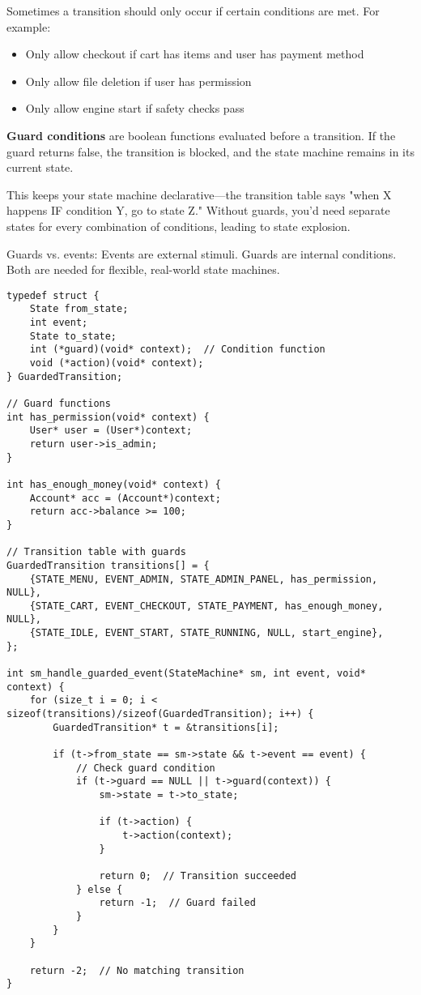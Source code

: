 Sometimes a transition should only occur if certain conditions are met. For example:
\begin{itemize}
    \item Only allow checkout if cart has items and user has payment method
    \item Only allow file deletion if user has permission
    \item Only allow engine start if safety checks pass
\end{itemize}

\textbf{Guard conditions} are boolean functions evaluated before a transition. If the guard returns false, the transition is blocked, and the state machine remains in its current state.

This keeps your state machine declarative---the transition table says "when X happens IF condition Y, go to state Z." Without guards, you'd need separate states for every combination of conditions, leading to state explosion.

Guards vs. events: Events are external stimuli. Guards are internal conditions. Both are needed for flexible, real-world state machines.

\begin{lstlisting}
typedef struct {
    State from_state;
    int event;
    State to_state;
    int (*guard)(void* context);  // Condition function
    void (*action)(void* context);
} GuardedTransition;

// Guard functions
int has_permission(void* context) {
    User* user = (User*)context;
    return user->is_admin;
}

int has_enough_money(void* context) {
    Account* acc = (Account*)context;
    return acc->balance >= 100;
}

// Transition table with guards
GuardedTransition transitions[] = {
    {STATE_MENU, EVENT_ADMIN, STATE_ADMIN_PANEL, has_permission, NULL},
    {STATE_CART, EVENT_CHECKOUT, STATE_PAYMENT, has_enough_money, NULL},
    {STATE_IDLE, EVENT_START, STATE_RUNNING, NULL, start_engine},
};

int sm_handle_guarded_event(StateMachine* sm, int event, void* context) {
    for (size_t i = 0; i < sizeof(transitions)/sizeof(GuardedTransition); i++) {
        GuardedTransition* t = &transitions[i];

        if (t->from_state == sm->state && t->event == event) {
            // Check guard condition
            if (t->guard == NULL || t->guard(context)) {
                sm->state = t->to_state;

                if (t->action) {
                    t->action(context);
                }

                return 0;  // Transition succeeded
            } else {
                return -1;  // Guard failed
            }
        }
    }

    return -2;  // No matching transition
}
\end{lstlisting}

